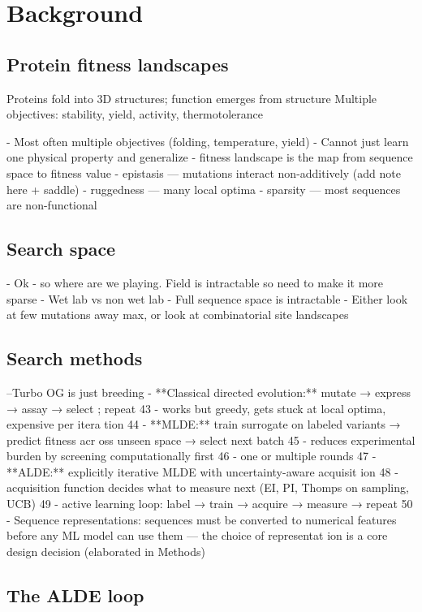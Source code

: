 \section{Background}
\subsection{Protein fitness landscapes}
Proteins fold into 3D structures; function emerges from structure
Multiple objectives: stability, yield, activity, thermotolerance

- Most often multiple objectives (folding, temperature, yield)
- Cannot just learn one physical property and generalize
- fitness landscape is the map from sequence space to fitness value
   - epistasis — mutations interact non-additively (add note here + saddle)
   - ruggedness — many local optima
   - sparsity — most sequences are non-functional
\subsection{Search space}
- Ok - so where are we playing. Field is intractable so need to make it more sparse
- Wet lab vs non wet lab
- Full sequence space is intractable 
- Either look at few mutations away max, or look at combinatorial site landscapes
\subsection{Search methods}
--Turbo OG is just breeding
- **Classical directed evolution:** mutate → express → assay → select
      ; repeat
   43   - works but greedy, gets stuck at local optima, expensive per itera
      tion
   44 - **MLDE:** train surrogate on labeled variants → predict fitness acr
      oss unseen space → select next batch
   45   - reduces experimental burden by screening computationally first
   46   - one or multiple rounds
   47 - **ALDE:** explicitly iterative MLDE with uncertainty-aware acquisit
      ion
   48   - acquisition function decides what to measure next (EI, PI, Thomps
      on sampling, UCB)
   49   - active learning loop: label → train → acquire → measure → repeat
   50 - Sequence representations: sequences must be converted to numerical
      features before any ML model can use them — the choice of representat
      ion is a core design decision (elaborated in Methods)


\subsection{The ALDE loop}

